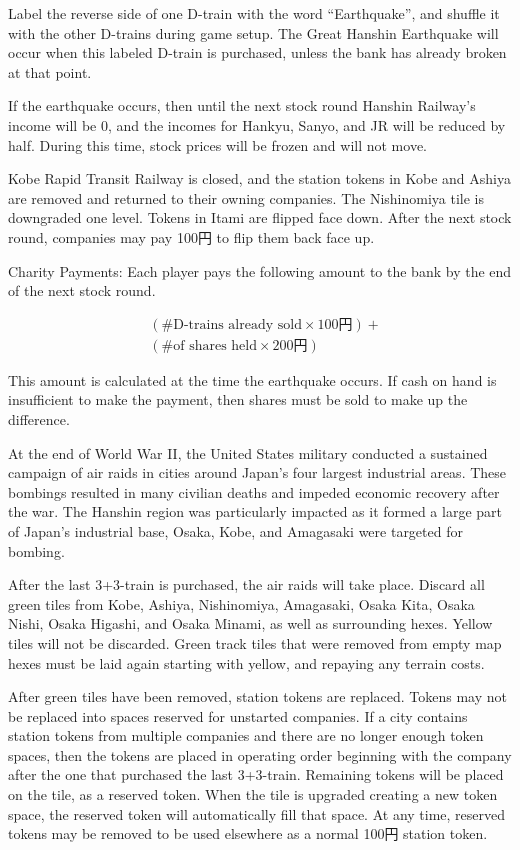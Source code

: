 \begin{multicols}{2}
Label the reverse side of one D-train with the word ``Earthquake'',
and shuffle it with the other D-trains during game setup. The Great
Hanshin Earthquake will occur when this labeled D-train is purchased,
unless the bank has already broken at that point.

If the earthquake occurs, then until the next stock round Hanshin
Railway's income will be 0, and the incomes for Hankyu, Sanyo, and JR
will be reduced by half. During this time, stock prices will be frozen
and will not move.

Kobe Rapid Transit Railway is closed, and the station tokens in Kobe
and Ashiya are removed and returned to their owning companies. The
Nishinomiya tile is downgraded one level. Tokens in Itami are flipped
face down. After the next stock round, companies may pay 100円 to flip
them back face up.

Charity Payments: Each player pays the following amount to the bank by
the end of the next stock round.

\begin{align*}
&(\textrm{\# D-trains already sold} \times \textrm{100円}) + \\
&(\textrm{\# of shares held} \times \textrm{200円})
\end{align*}

This amount is calculated at the time the earthquake occurs. If cash
on hand is insufficient to make the payment, then shares must be sold to
make up the difference.


At the end of World War II, the United States military conducted a
sustained campaign of air raids in cities around Japan's four
largest industrial areas. These bombings resulted in many civilian
deaths and impeded economic recovery after the war. The Hanshin region
was particularly impacted as it formed a large part of Japan's
industrial base, Osaka, Kobe, and Amagasaki were targeted for bombing.

After the last 3+3-train is purchased, the air raids will take
place. Discard all green tiles from Kobe, Ashiya, Nishinomiya,
Amagasaki, Osaka Kita, Osaka Nishi, Osaka Higashi, and Osaka Minami,
as well as surrounding hexes. Yellow tiles will not be
discarded. Green track tiles that were removed from empty map hexes
must be laid again starting with yellow, and repaying any terrain costs.

After green tiles have been removed, station tokens are
replaced. Tokens may not be replaced into spaces reserved for
unstarted companies. If a city contains station tokens from multiple
companies and there are no longer enough token spaces, then the tokens
are placed in operating order beginning with the company after the one
that purchased the last 3+3-train. Remaining tokens will be placed on
the tile, as a reserved token. When the tile is upgraded creating a
new token space, the reserved token will automatically fill that
space. At any time, reserved tokens may be removed to be used
elsewhere as a normal 100円 station token.


\end{multicols}

